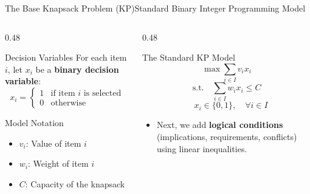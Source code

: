 \documentclass[aspectratio=169]{beamer}
\begin{document}
\begin{frame}{The Base Knapsack Problem (KP)}{Standard Binary Integer Programming Model}
    \begin{columns}[T]
        \begin{column}{0.48\textwidth}
            \begin{block}{Decision Variables}
                For each item $i$, let $x_i$ be a \textbf{binary decision variable}:
                \[ x_i = \begin{cases}
                    1 & \text{if item } i \text{ is selected} \\
                    0 & \text{otherwise}
                \end{cases} \]
            \end{block}

            \begin{block}{Model Notation}
                \begin{itemize}
                    \item $v_i$: Value of item $i$
                    \item $w_i$: Weight of item $i$
                    \item $C$: Capacity of the knapsack
                \end{itemize}
            \end{block}
        \end{column}
        \begin{column}{0.48\textwidth}
            \begin{alertblock}{The Standard KP Model}
                \[ \max \sum_{i \in I} v_i x_i \]
                \[ \text{s.t.} \quad \sum_{i \in I} w_i x_i \le C \]
                \[ \quad x_i \in \{0, 1\}, \quad \forall i \in I \]
            \end{alertblock}

            \begin{itemize}
                \item Next, we add \textbf{logical conditions} (implications, requirements, conflicts) using linear inequalities.
            \end{itemize}
        \end{column}
    \end{columns}
\end{frame}
\end{document}
